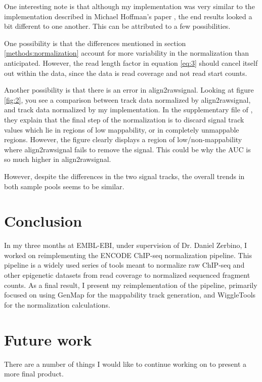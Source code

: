 \documentclass[a4paper]{article}
\begin{document}
    One interesting note is that although my implementation
    was very similar to the implementation described in Michael Hoffman's paper \cite{hoffman_integrative_2013}, the
    end results looked a bit different to one another. This can be attributed to a few possibilities.

    One possibility is that the differences mentioned in section \ref{methods:normalization} account for more variability
    in the normalization than anticipated. However, the read length factor in equation \ref{eq:3} should cancel itself out
    within the data, since the data is read coverage and not read start counts.

    Another possibility is that there is an error in align2rawsignal. Looking at figure \ref{fig:2}, you see a comparison
    between track data normalized by align2rawsignal, and track data normalized by my implementation. In the
    supplementary file of \cite{hoffman_integrative_2013}, they explain that the final step of the normalization is to
    discard signal track values which lie in regions of low mappability, or in completely unmappable regions. However,
    the figure clearly displays a region of low/non-mappability where align2rawsignal fails to remove the signal. This
    could be why the AUC is so much higher in align2rawsignal.

    However, despite the differences in the two signal tracks, the overall trends in both sample pools seems to be similar.

  \section{Conclusion}
  In my three months at EMBL-EBI, under supervision of Dr. Daniel Zerbino, I worked on reimplementing the ENCODE ChIP-seq
  normalization pipeline. This pipeline is a widely used series of tools meant to normalize raw ChIP-seq and other
  epigenetic datasets from read coverage to normalized sequenced fragment counts. As a final result, I present my
  reimplementation of the pipeline, primarily focused on using GenMap \cite{pockrandt_genmap:_2019} for the mappability
  track generation, and WiggleTools \cite{zerbino_wiggletools:_2014} for the normalization calculations.

  \section{Future work}
  There are a number of things I would like to continue working on to present a more final product.
\end{document}
